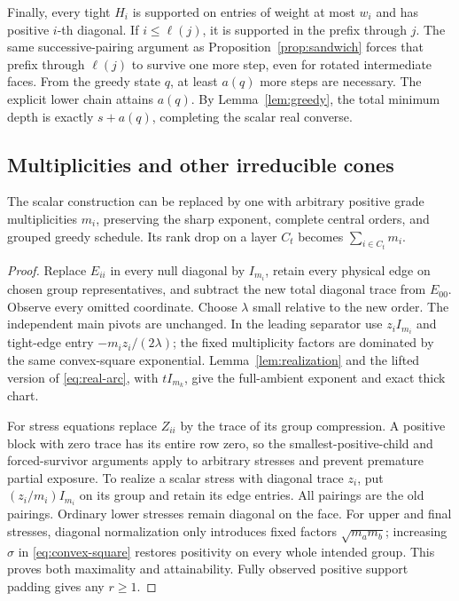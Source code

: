 Finally, every tight $H_i$ is supported on entries of weight at most $w_i$ and has positive $i$-th diagonal. If $i\le\ell(j)$, it is supported in the prefix through $j$. The same successive-pairing argument as Proposition~\ref{prop:sandwich} forces that prefix through $\ell(j)$ to survive one more step, even for rotated intermediate faces. From the greedy state $q$, at least $a(q)$ more steps are necessary. The explicit lower chain attains $a(q)$. By Lemma~\ref{lem:greedy}, the total minimum depth is exactly $s+a(q)$, completing the scalar real converse.

\subsection{Multiplicities and other irreducible cones}
\begin{lemma}\label{lem:multiplicity}
The scalar construction can be replaced by one with arbitrary positive grade multiplicities $m_i$, preserving the sharp exponent, complete central orders, and grouped greedy schedule. Its rank drop on a layer $C_t$ becomes $\sum_{i\in C_t}m_i$.
\end{lemma}
\begin{proof}
Replace $E_{ii}$ in every null diagonal by $I_{m_i}$, retain every physical edge on chosen group representatives, and subtract the new total diagonal trace from $E_{00}$. Observe every omitted coordinate. Choose $\lambda$ small relative to the new order. The independent main pivots are unchanged. In the leading separator use $z_iI_{m_i}$ and tight-edge entry $-m_i z_i/(2\lambda)$; the fixed multiplicity factors are dominated by the same convex-square exponential. Lemma~\ref{lem:realization} and the lifted version of \eqref{eq:real-arc}, with $tI_{m_k}$, give the full-ambient exponent and exact thick chart.

For stress equations replace $Z_{ii}$ by the trace of its group compression. A positive block with zero trace has its entire row zero, so the smallest-positive-child and forced-survivor arguments apply to arbitrary stresses and prevent premature partial exposure. To realize a scalar stress with diagonal trace $z_i$, put $(z_i/m_i)I_{m_i}$ on its group and retain its edge entries. All pairings are the old pairings. Ordinary lower stresses remain diagonal on the face. For upper and final stresses, diagonal normalization only introduces fixed factors $\sqrt{m_a m_b}$; increasing $\sigma$ in \eqref{eq:convex-square} restores positivity on every whole intended group. This proves both maximality and attainability. Fully observed positive support padding gives any $r\ge1$.
\end{proof}

